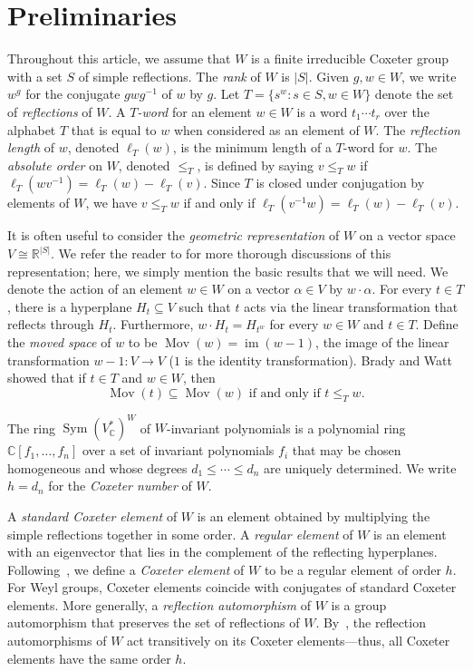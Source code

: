 \documentclass[ALCO,ThmDefs,Unicode,epreuves]{cedram}
\newcommand{\darkblue}{\color{darkblue}}
\newcommand{\defn}[1]{\emph{\darkblue #1}}
\DeclareMathOperator{\mov}{Mov}
\DeclareMathOperator{\im}{im}
\DeclareMathOperator{\Sym}{Sym}
\begin{document}
\section{Preliminaries}
Throughout this article, we assume that $W$ is a finite irreducible Coxeter group with a set $S$ of simple reflections. The \defn{rank} of $W$ is $|S|$. Given $g,w\in W$, we write $w^g$ for the conjugate $gwg^{-1}$ of $w$ by $g$. Let $T=\{s^w:s\in S, w\in W\}$ denote the set of \defn{reflections} of $W$. A \defn{$T$-word} for an element $w\in W$ is a word $t_1\cdots t_r$ over the alphabet $T$ that is equal to $w$ when considered as an element of $W$. The \defn{reflection length} of $w$, denoted $\ell_T(w)$, is the minimum length of a $T$-word for $w$. The \defn{absolute order} on $W$, denoted $\leq_T$, is defined by saying $v\leq_T w$ if $\ell_T(wv^{-1})=\ell_T(w)-\ell_T(v)$. Since $T$ is closed under conjugation by elements of $W$, we have $v\leq_T w$ if and only if $\ell_T(v^{-1}w)=\ell_T(w)-\ell_T(v)$. 

It is often useful to consider the \defn{geometric representation} of $W$ on a vector space $V\cong\mathbb R^{|S|}$. We refer the reader to \cite{armstrong2009generalized, BjornerBrenti} for more thorough discussions of this representation; here, we simply mention the basic results that we will need. We denote the action of an element $w\in W$ on a vector $\alpha\in V$ by $w\cdot\alpha$. For every $t\in T$, there is a hyperplane $H_t\subseteq V$ such that $t$ acts via the linear transformation that reflects through $H_t$. Furthermore, $w\cdot H_t=H_{t^w}$ for every $w\in W$ and $t\in T$. Define the \defn{moved space} of $w$ to be $\mov(w)=\im(w-1)$, the image of the linear transformation $w-1:V\to V$ ($1$ is the identity transformation). Brady and Watt \cite{BradyWatt} showed that if $t\in T$ and $w\in W$, then \begin{equation}\label{EqBradyWatt}
\mov(t)\subseteq\mov(w)\text{ if and only if }t\leq _T w.
\end{equation}

The ring $\Sym(V_\mathbb{C}^*)^W$ of $W$-invariant polynomials is a polynomial ring $\mathbb{C}[f_1,\ldots,f_n]$ over a set of invariant polynomials $f_i$ that may be chosen homogeneous and whose degrees $d_1 \leq \cdots \leq d_n$ are uniquely determined.  We write $h=d_n$ for the \defn{Coxeter number} of $W$.

A \defn{standard Coxeter element} of $W$ is an element obtained by multiplying the simple reflections together in some order.  A \defn{regular element} of $W$ is an element with an eigenvector that lies in the complement of the reflecting hyperplanes.  Following~\cite{reiner2017non}, we define a \defn{Coxeter element} of $W$ to be a regular element of order $h$.  For Weyl groups, Coxeter elements coincide with conjugates of standard Coxeter elements.  
More generally, a \defn{reflection automorphism} of $W$ is a group automorphism that preserves the set of reflections of $W$.  By~\cite[Proposition~1.4]{reiner2017non}, the reflection automorphisms of $W$ act transitively on its Coxeter elements---thus, all Coxeter elements have the same order $h$.
\end{document}
